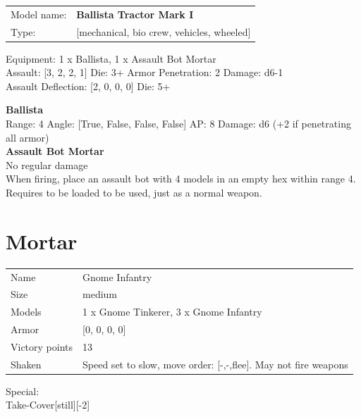 \begin{tabular}{ll}
Model name: & {\bf Ballista Tractor Mark I } \\
Type: & [mechanical, bio crew, vehicles, wheeled] \\
\end{tabular}

Equipment: 1 x Ballista, 1 x Assault Bot Mortar \\

Assault: [3, 2, 2, 1] Die: 3+ Armor Penetration: 2 Damage: d6-1 \\
Assault Deflection: [2, 0, 0, 0] Die: 5+\\
\indent  



{\bf Ballista } \\



Range: 4  Angle: [True, False, False, False] AP: 8 Damage: d6 (+2 if penetrating all armor) \\




{\bf Assault Bot Mortar } \\

No regular damage\\ 
When firing, place an assault bot with 4 models in an empty hex within range 4. Requires to be loaded to be used, just as a normal weapon.\\ 





 















\clearpage

\section{ Mortar }

\begin{tabular}{ll}
  Name & Gnome Infantry \\
  Size & medium\\
  Models & 1 x Gnome Tinkerer, 3 x Gnome Infantry\\
  Armor & [0, 0, 0, 0]\\
  Victory points & 13\\
  Shaken & Speed set to slow, move order: [-,-,flee]. May not fire weapons\\
\end{tabular}
Special: \\
Take-Cover[still][-2]\\ 



